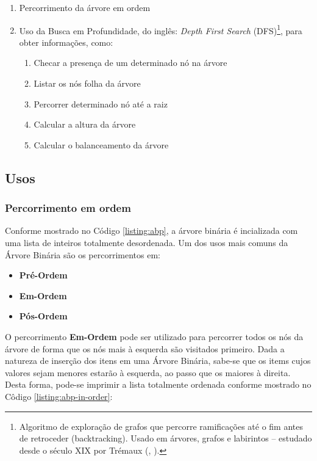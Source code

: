 \begin{enumerate}
    \item Percorrimento da árvore em ordem
    \item Uso da Busca em Profundidade, do inglês: \textit{Depth First Search} (DFS)\footnote{
        Algoritmo de exploração de grafos que percorre ramificações até o fim antes de retroceder (backtracking). Usado em árvores, grafos e labirintos – estudado desde o século XIX por Trémaux (\citeauthor{wiki_dfs}, \citeyear{wiki_dfs})\cite{wiki_dfs}.
    }, para obter informações, como:
    \begin{enumerate}
        \item Checar a presença de um determinado nó na árvore
        \item Listar os nós folha da árvore
        \item Percorrer determinado nó até a raiz
        \item Calcular a altura da árvore
        \item Calcular o balanceamento da árvore
    \end{enumerate}
\end{enumerate}

\subsection{Usos}
\subsubsection{Percorrimento em ordem}
Conforme mostrado no Código \ref{listing:abp}, a árvore binária é incializada com uma lista de inteiros totalmente desordenada.
Um dos usos mais comuns da Árvore Binária são os percorrimentos em:
\begin{itemize}
    \item\textbf{Pré-Ordem}
    \item\textbf{Em-Ordem}
    \item\textbf{Pós-Ordem}
\end{itemize}

O percorrimento \textbf{Em-Ordem} pode ser utilizado para percorrer todos os nós da árvore de forma que os nós mais à esquerda são visitados primeiro. Dada a natureza de inserção dos itens em uma Árvore Binária,
sabe-se que os items cujos valores sejam menores estarão à esquerda, ao passo que os maiores à direita. Desta forma, pode-se imprimir a lista totalmente ordenada conforme mostrado no Côdigo \ref{listing:abp-in-order}:

